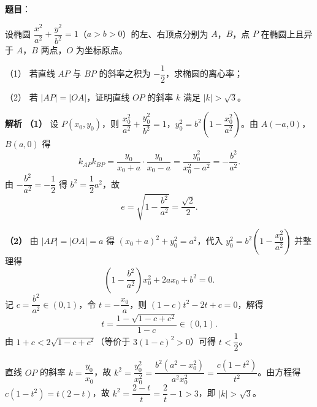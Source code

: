 \begin{answer}

\textbf{题目}：

设椭圆 $\dfrac{x^2}{a^2}+\dfrac{y^2}{b^2}=1$（$a>b>0$）的左、右顶点分别为 $A$，$B$，点 $P$ 在椭圆上且异于 $A$，$B$ 两点，$O$ 为坐标原点。

（1） 若直线 $AP$ 与 $BP$ 的斜率之积为 $-\dfrac12$，求椭圆的离心率；

（2） 若 $|AP|=|OA|$，证明直线 $OP$ 的斜率 $k$ 满足 $|k|>\sqrt3$。

\textbf{解析}
\textbf{（1）} 设 $P(x_0,y_0)$，则 $\dfrac{x_0^2}{a^2}+\dfrac{y_0^2}{b^2}=1$，$y_0^2=b^2\left(1-\dfrac{x_0^2}{a^2}\right)$。由 $A(-a,0)$，$B(a,0)$ 得
\nopagebreak[4]
\[k_{AP}k_{BP}=\frac{y_0}{x_0+a}\cdot\frac{y_0}{x_0-a}=\frac{y_0^2}{x_0^2-a^2}=-\frac{b^2}{a^2}.\]
由 $-\dfrac{b^2}{a^2}=-\dfrac12$ 得 $b^2=\dfrac12a^2$，故
\nopagebreak[4]
\[e=\sqrt{1-\frac{b^2}{a^2}}=\frac{\sqrt2}2.\]

\textbf{（2）} 由 $|AP|=|OA|=a$ 得 $(x_0+a)^2+y_0^2=a^2$，代入 $y_0^2=b^2\left(1-\dfrac{x_0^2}{a^2}\right)$ 并整理得
\nopagebreak[4]
\[\left(1-\frac{b^2}{a^2}\right)x_0^2+2ax_0+b^2=0.\]
记 $c=\dfrac{b^2}{a^2}\in(0,1)$，令 $t=-\dfrac{x_0}a$，则 $(1-c)t^2-2t+c=0$，解得
\nopagebreak[4]
\[t=\frac{1-\sqrt{1-c+c^2}}{1-c}\in(0,1).\]
由 $1+c<2\sqrt{1-c+c^2}$（等价于 $3(1-c)^2>0$）可得 $t<\dfrac12$。

直线 $OP$ 的斜率 $k=\dfrac{y_0}{x_0}$，故 $k^2=\dfrac{y_0^2}{x_0^2}=\dfrac{b^2(a^2-x_0^2)}{a^2x_0^2}=\dfrac{c(1-t^2)}{t^2}$。由方程得 $c(1-t^2)=t(2-t)$，故 $k^2=\dfrac{2-t}{t}=\dfrac2t-1>3$，即 $|k|>\sqrt3$。



\end{answer}
